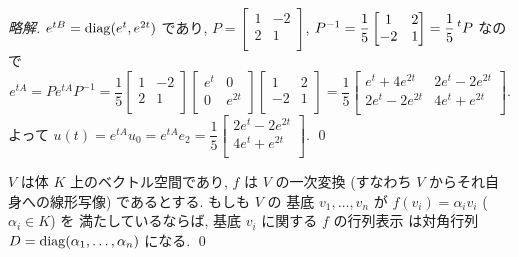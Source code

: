 \documentclass[12pt,twoside]{jarticle}
\newcommand\commentout[1]{#1}
\newcommand\commentout[1]{}
\begin{document}
\commentout{
\begin{proof}[略解]
  $e^{tB}=\mathop{\mathrm{diag}}\nolimits(e^t,e^{2t})$ であり, 
  $P=
  \begin{bmatrix}
    1 & -2 \\
    2 & 1 \\
  \end{bmatrix}$, $P^{-1}=\dfrac{1}{5}
  \begin{bmatrix}
    1 & 2 \\
    -2 & 1 \\
  \end{bmatrix} = \dfrac{1}{5}\tp{P}$ なので
  \begin{equation*}
    e^{tA} 
    = Pe^{tA}P^{-1}
    = \frac{1}{5}
  \begin{bmatrix}
    1 & -2 \\
    2 & 1 \\
  \end{bmatrix}
  \begin{bmatrix}
    e^t & 0 \\
    0 & e^{2t} \\
  \end{bmatrix}
  \begin{bmatrix}
    1 & 2 \\
    -2 & 1 \\
  \end{bmatrix}
  =
  \frac{1}{5}
  \begin{bmatrix}
    e^t + 4e^{2t}  & 2e^t - 2e^{2t} \\
    2e^t - 2e^{2t} & 4e^t + e^{2t} \\
  \end{bmatrix}.
  \end{equation*}
  よって $u(t) = e^{tA}u_0 = e^{tA}e_2 = \dfrac{1}{5}
  \begin{bmatrix}
    2e^t - 2e^{2t} \\
    4e^t + e^{2t} \\
  \end{bmatrix}$. \qed
\end{proof}
}


\begin{question}[一次変換の対角化]
  $V$ は体 $K$ 上のベクトル空間であり, $f$ は $V$ の一次変換 (すなわち $V$ 
  からそれ自身への線形写像) であるとする. もしも $V$ の
  基底 $v_1,\ldots,v_n$ が $f(v_i)=\alpha_i v_i$ ($\alpha_i\in K$) を
  満たしているならば, 基底 $v_i$ に関する $f$ の行列表示
  は対角行列 $D=\mathop{\mathrm{diag}}\nolimits(\alpha_1,\ldots,\alpha_n)$ になる.
  \qed
\end{question}
\end{document}
